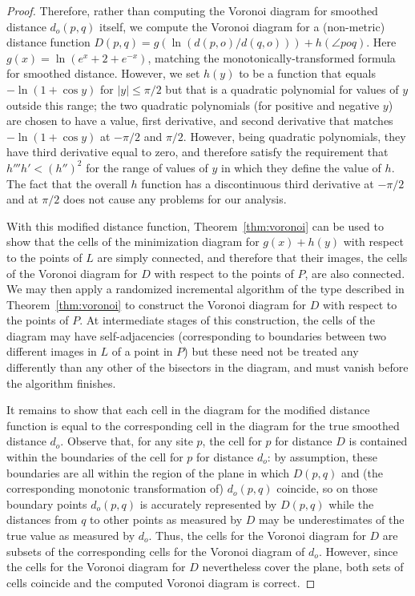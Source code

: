 \documentclass[10pt, conference, compsocconf]{IEEEtran}
\begin{document}
\begin{proof}
Therefore, rather than computing the Voronoi diagram for smoothed distance $d_o(p,q)$ itself, we compute
the Voronoi diagram for a (non-metric) distance function $D(p,q)=g(\ln(d(p,o)/d(q,o))) + h(\angle poq)$.
Here $g(x)=\ln(e^x+2+e^{-x})$, matching the monotonically-transformed formula for smoothed distance. However, we set $h(y)$ to be a function that equals $-\ln(1+\cos y)$ for $|y|\le\pi/2$ but that is a quadratic polynomial for values of $y$ outside this range; the two quadratic polynomials (for positive and negative $y$) are chosen to have a value, first derivative, and second derivative that matches $-\ln(1+\cos y)$ at $-\pi/2$ and $\pi/2$. However, being quadratic polynomials, they have third derivative equal to zero, and therefore satisfy the requirement that $h'''h'<(h'')^2$ for the range of values of $y$ in which they define the value of $h$. The fact that the overall $h$ function has a discontinuous third derivative at $-\pi/2$ and at $\pi/2$ does not cause any problems for our analysis.

With this modified distance function, Theorem~\ref{thm:voronoi} can be used to show that the cells of the minimization diagram for $g(x)+h(y)$ with respect to the points of $L$ are simply connected, and therefore that their images, the cells of the Voronoi diagram for $D$ with respect to the points of $P$, are also connected. We may then apply a randomized incremental algorithm of the type described in Theorem~\ref{thm:voronoi} to construct the Voronoi diagram for $D$ with respect to the points of $P$. At intermediate stages of this construction, the cells of the diagram may have self-adjacencies (corresponding to boundaries between two different images in $L$ of a point in $P$) but these need not be treated any differently than any other of the bisectors in the diagram, and must vanish before the algorithm finishes.

It remains to show that each cell in the diagram for the modified distance function is equal to the corresponding cell in the diagram for the true smoothed distance $d_o$. Observe that, for any site $p$, the cell for $p$ for distance $D$ is contained within the boundaries of the cell for $p$ for distance $d_o$: by assumption, these boundaries are all within the region of the plane in which $D(p,q)$ and (the corresponding monotonic transformation of) $d_o(p,q)$ coincide, so on those boundary points $d_o(p,q)$ is accurately represented by $D(p,q)$ while the distances from $q$ to other points as measured by $D$ may be underestimates of the true value as measured by $d_o$. Thus, the cells for the Voronoi diagram for $D$ are subsets of the corresponding cells for the Voronoi diagram of $d_o$. However, since the cells for the Voronoi diagram for $D$ nevertheless cover the plane, both sets of cells coincide and the computed Voronoi diagram is correct.
\end{proof}
\end{document}
